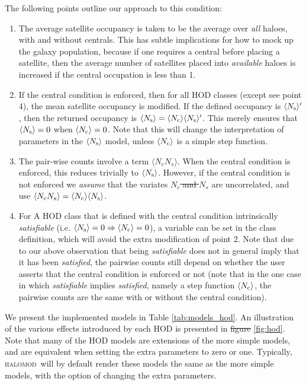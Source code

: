 \documentclass[5p,aas_macros]{elsarticle}
\newcommand{\Nc}{\langle N_{\rm c} \rangle} %
\newcommand{\Ns}{\langle N_{\rm s} \rangle} %
\newcommand{\halomod}{\textsc{halomod}\xspace} %
\providecommand{\DIFaddtex}[1]{{\protect\color{blue}\uwave{#1}}} %
\providecommand{\DIFdeltex}[1]{{\protect\color{red}\sout{#1}}}                      %
\providecommand{\DIFaddbegin}{} %
\providecommand{\DIFaddend}{} %
\providecommand{\DIFdelbegin}{} %
\providecommand{\DIFdelend}{} %
\providecommand{\DIFadd}[1]{\texorpdfstring{\DIFaddtex{#1}}{#1}} %
\providecommand{\DIFdel}[1]{\texorpdfstring{\DIFdeltex{#1}}{}} %
\begin{document}
The following points outline our approach to this condition:
\begin{enumerate}
    \item The average satellite occupancy is taken to be the average over \textit{all} haloes, with and without centrals. This has subtle implications for how to mock up the galaxy population, because if one requires a central before placing a satellite, then the average number of satellites placed into \textit{available} haloes is increased if the central occupation is less than 1.

    \item If the central condition is enforced, then for all HOD classes (except see point 4), the mean satellite occupancy is modified. If the defined occupancy is $\Ns'$, then the returned occupancy is $\Ns = \Nc\Ns'$. This merely ensures that $\Ns=0$ when $\Nc=0$. Note that this will change the interpretation of parameters in the $\Ns$ model, unless $\Nc$ is a simple step function.

    \item The pair-wise counts involve a term \DIFdelbegin \DIFdel{$\langle N_c N_s\rangle$}\DIFdelend \DIFaddbegin \DIFadd{$\langle N_{\rm c} N_{\rm s}\rangle$}\DIFaddend . When the central condition is enforced, this reduces trivially to $\Ns$. However, if the central condition is not enforced we \textit{assume} that the variates \DIFdelbegin \DIFdel{$N_c$ and $N_s$ }\DIFdelend \DIFaddbegin \DIFadd{$N_{\rm c}$ and $N_{\rm s}$ }\DIFaddend are uncorrelated, and use \DIFdelbegin \DIFdel{$\langle N_c N_s\rangle = \Nc\Ns$}\DIFdelend \DIFaddbegin \DIFadd{$\langle N_{\rm c} N_{\rm s}\rangle = \Nc\Ns$}\DIFaddend .

    \item For A HOD class that is defined with the central condition intrinsically \textit{satisfiable} (i.e. $\Ns=0 \Rightarrow \Nc=0$), a variable can be set in the class definition, which will avoid the extra modification of point 2. Note that due to our above observation that being \textit{satisfiable} does not in general imply that it has been \textit{satisfied}, the pairwise counts still depend on whether the user asserts that the central condition is enforced or not (note that in the one case in which \textit{satisfiable} implies \textit{satisfied}, namely a step function $\Nc$, the pairwise counts are the same with or without the central condition).
\end{enumerate}

We present the implemented models in Table \ref{tab:models_hod}. An illustration of the various effects introduced by each HOD is presented in \DIFdelbegin \DIFdel{figure }\DIFdelend \DIFaddbegin \DIFadd{Fig. }\DIFaddend \ref{fig:hod}. Note that many of the HOD models are extensions of the more simple models, and are equivalent when setting the extra parameters to zero or one. Typically, \halomod\ will by default render these models the same as the more simple models, with the option of changing the extra parameters.
\end{document}
